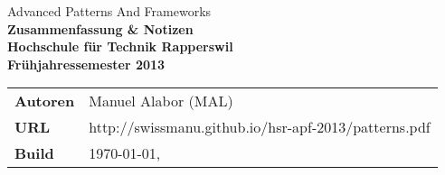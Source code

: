 \begin{titlepage}

	\thispagestyle{empty}
	\BgThispage

	\sffamily\color{titlepagefontcolor}
	\begin{center}
		\Large
		Advanced Patterns And Frameworks\\[5mm]
	   
		\Huge\bfseries
		Zusammenfassung \& Notizen\\[15mm]

		\large\normalfont\sffamily
		Hochschule für Technik Rapperswil\\[1mm]
		Frühjahressemester 2013
	\end{center}
	\vfill

	\begin{multicols}{2}
		\begin{tabularx}{\textwidth}{l X}
			\bfseries Autoren & Manuel Alabor (MAL)\tabularnewline
			\bfseries URL & http://swissmanu.github.io/hsr-apf-2013/patterns.pdf\tabularnewline
			\bfseries Build & \today, \currenttime\tabularnewline
		\end{tabularx}
		
	\end{multicols}

\end{titlepage}

\restoregeometry